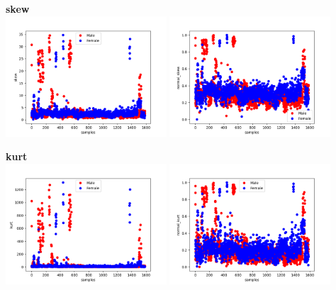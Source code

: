 \documentclass[12pt]{article}
\begin{document}
\begin{justify}
			\textbf{skew}\\
				\includegraphics[width=6cm]{../Graphs2/skew}
				\includegraphics[width=6cm]{../Graphs2/norm_skew}	
				
			\textbf{kurt}\\
				\includegraphics[width=6cm]{../Graphs2/kurt}
				\includegraphics[width=6cm]{../Graphs2/norm_kurt}	
				

\end{justify}
\end{document}
